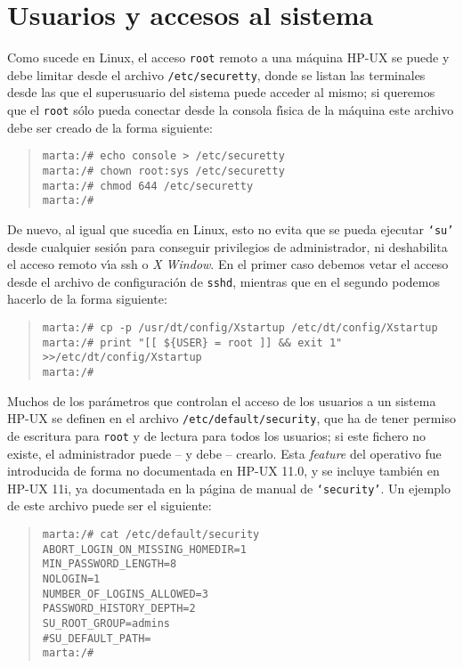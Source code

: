 \section{Usuarios y accesos al sistema}
Como sucede en Linux, el acceso {\tt root} remoto a una m\'aquina HP-UX se puede
y debe limitar desde el archivo {\tt /etc/securetty}, donde se listan las
terminales desde las que el superusuario del sistema puede acceder al mismo; si
queremos que el {\tt root} s\'olo pueda conectar desde la consola f\'{\i}sica
de la m\'aquina este archivo debe ser creado de la forma siguiente:
\begin{quote}
\begin{verbatim}
marta:/# echo console > /etc/securetty 
marta:/# chown root:sys /etc/securetty 
marta:/# chmod 644 /etc/securetty 
marta:/# 
\end{verbatim}
\end{quote}
De nuevo, al igual que suced\'{\i}a en Linux, esto no evita que se pueda 
ejecutar {\tt `su'} desde cualquier sesi\'on para 
conseguir privilegios de administrador, ni deshabilita el acceso remoto 
v\'{\i}a {\sc ssh} o {\it X Window}. En el primer caso debemos vetar el acceso
desde el archivo de configuraci\'on de {\tt sshd}, mientras que en el segundo
podemos hacerlo de la forma siguiente:
\begin{quote}
\begin{verbatim}
marta:/# cp -p /usr/dt/config/Xstartup /etc/dt/config/Xstartup 
marta:/# print "[[ ${USER} = root ]] && exit 1" >>/etc/dt/config/Xstartup 
marta:/# 
\end{verbatim}
\end{quote}
Muchos de los par\'ametros que controlan el acceso de los usuarios a un sistema
HP-UX se definen en el archivo {\tt /etc/default/security}, que ha de tener 
permiso de escritura para {\tt root} y de lectura para todos los usuarios; si 
este fichero no existe, el administrador puede -- y debe -- crearlo. Esta
{\it feature} del operativo fue introducida de forma no documentada en HP-UX
11.0, y se incluye tambi\'en en HP-UX 11i, ya documentada en la p\'agina de 
manual de {\tt `security'}. Un ejemplo de este archivo puede ser el siguiente:
\begin{quote}
\begin{verbatim}
marta:/# cat /etc/default/security
ABORT_LOGIN_ON_MISSING_HOMEDIR=1
MIN_PASSWORD_LENGTH=8
NOLOGIN=1
NUMBER_OF_LOGINS_ALLOWED=3
PASSWORD_HISTORY_DEPTH=2
SU_ROOT_GROUP=admins
#SU_DEFAULT_PATH=
marta:/# 
\end{verbatim}
\end{quote}
